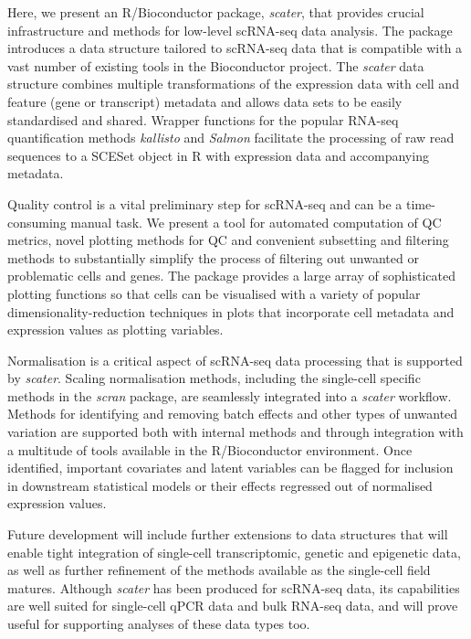 \documentclass{bioinfo}
\begin{document}
Here, we present an R/Bioconductor package, \emph{scater}, that provides
crucial infrastructure and methods for low-level scRNA-seq data
analysis. The package introduces a data structure tailored to scRNA-seq
data that is compatible with a vast number of existing tools in the
Bioconductor project. The \emph{scater} data structure combines multiple
transformations of the expression data with cell and feature (gene or
transcript) metadata and allows data sets to be easily standardised and
shared. Wrapper functions for the popular RNA-seq quantification methods
\emph{kallisto} and \emph{Salmon} facilitate the processing of raw read
sequences to a SCESet object in R with expression data and accompanying
metadata.

Quality control is a vital preliminary step for scRNA-seq and can be a
time-consuming manual task. We present a tool for automated computation
of QC metrics, novel plotting methods for QC and convenient subsetting
and filtering methods to substantially simplify the process of filtering
out unwanted or problematic cells and genes. The package provides a
large array of sophisticated plotting functions so that cells can be
visualised with a variety of popular dimensionality-reduction techniques
in plots that incorporate cell metadata and expression values as
plotting variables.

Normalisation is a critical aspect of scRNA-seq data processing that is supported by \emph{scater}. Scaling normalisation methods, including the single-cell specific methods in the \emph{scran} package, are seamlessly integrated into a \emph{scater} workflow. Methods for identifying and removing batch effects and other types of unwanted variation are supported both with internal methods and through integration with a multitude of tools available in the R/Bioconductor environment. Once identified, important covariates and latent variables can be flagged for inclusion in downstream statistical models or their effects regressed out of normalised expression values.

Future development will include further extensions to data structures that will enable tight integration of single-cell transcriptomic, genetic and epigenetic data, as well as further refinement of the methods available as the single-cell field matures. Although \emph{scater} has been produced for
scRNA-seq data, its capabilities are well suited for single-cell qPCR data
and bulk RNA-seq data, and will prove useful for supporting analyses of these data types too.
\end{document}
